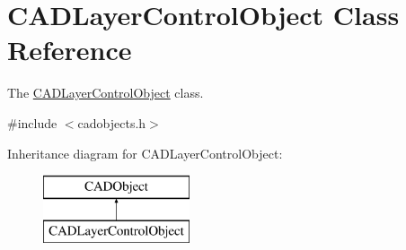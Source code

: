 \hypertarget{class_c_a_d_layer_control_object}{}\section{C\+A\+D\+Layer\+Control\+Object Class Reference}
\label{class_c_a_d_layer_control_object}


The \hyperlink{class_c_a_d_layer_control_object}{C\+A\+D\+Layer\+Control\+Object} class.  




{\ttfamily \#include $<$cadobjects.\+h$>$}

Inheritance diagram for C\+A\+D\+Layer\+Control\+Object\+:\begin{figure}[H]
\begin{center}
\leavevmode
\includegraphics[height=2.000000cm]{class_c_a_d_layer_control_object}
\end{center}
\end{figure}
